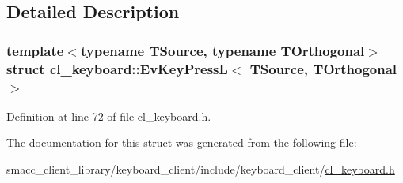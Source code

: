 \subsection{Detailed Description}
\subsubsection*{template$<$typename T\+Source, typename T\+Orthogonal$>$\newline
struct cl\+\_\+keyboard\+::\+Ev\+Key\+Press\+L$<$ T\+Source, T\+Orthogonal $>$}



Definition at line 72 of file cl\+\_\+keyboard.\+h.



The documentation for this struct was generated from the following file\+:\begin{DoxyCompactItemize}
\item 
smacc\+\_\+client\+\_\+library/keyboard\+\_\+client/include/keyboard\+\_\+client/\hyperlink{cl__keyboard_8h}{cl\+\_\+keyboard.\+h}\end{DoxyCompactItemize}

